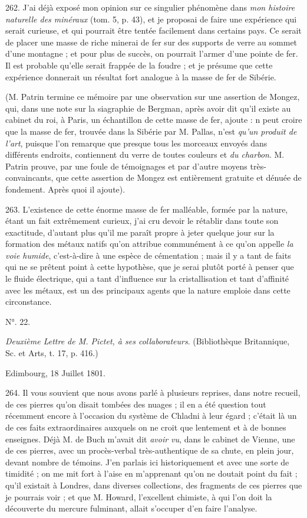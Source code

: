 \documentclass[a4paper, 11pt, oneside, polutonikogreek, french]{article}
\begin{document}
262. J'ai déjà exposé mon opinion sur ce singulier phénomène dans \emph{mon histoire naturelle des minéraux} (tom. 5, p. 43), et je proposai de faire une expérience qui serait curieuse, et qui pourrait être tentée facilement dans certains pays. Ce serait de placer une masse de riche minerai de fer sur des supports de verre au sommet d'une montagne ; et pour plus de succès, on pourrait l'armer d'une pointe de fer. Il est probable qu'elle serait frappée de la foudre ; et je présume que cette expérience donnerait un résultat fort analogue à la masse de fer de Sibérie.

(M. Patrin termine ce mémoire par une observation sur une assertion de Mongez, qui, dans une note sur la siagraphie de Bergman, après avoir dit qu'il existe au cabinet du roi, à Paris, un échantillon de cette masse de fer, ajoute : \og n peut croire que la masse de fer, trouvée dans la Sibérie par M. Pallas, n'est \emph{qu'un produit de l'art}, puisque l'on remarque que presque tous les morceaux envoyés dans différents endroits, contiennent du verre de toutes couleurs et \emph{du charbon}. \fg M. Patrin prouve, par une foule de témoignages et par d'autre moyens très-convaincants, que cette assertion de Mongez est entièrement gratuite et dénuée de fondement. Après quoi il ajoute).

263. \og L'existence de cette énorme masse de fer malléable, formée par la nature, étant un fait extrêmement curieux, j'ai cru devoir le rétablir dans toute son exactitude, d'autant plus qu'il me paraît propre à jeter quelque jour sur la formation des métaux natifs qu'on attribue communément à ce qu'on appelle \emph{la voie humide}, c'est-à-dire à une espèce de cémentation ; mais il y a tant de faits qui ne se prêtent point à cette hypothèse, que je serai plutôt porté à penser que le fluide électrique, qui a tant d'influence sur la cristallisation et tant d'affinité avec les métaux, est un des principaux agents que la nature emploie dans cette circonstance. \fg

\begin{center}
N°. 22.
\end{center}

\emph{Deuxième Lettre de M. Pictet, à ses collaborateurs}. (Bibliothèque Britannique, Sc. et Arts, t. 17, p. 416.)

Edimbourg, 18 Juillet 1801.

264. Il vous souvient que nous avons parlé à plusieurs reprises, dans notre recueil, de ces pierres qu'on disait tombées des nuages ; il en a été question tout récemment encore à l'occasion du système de Chladni à leur égard ; c'était là un de ces faits extraordinaires auxquels on ne croit que lentement et à de bonnes enseignes. Déjà M. de Buch m'avait dit \emph{avoir vu}, dans le cabinet de Vienne, une de ces pierres, avec un procès-verbal très-authentique de sa chute, en plein jour, devant nombre de témoins. J'en parlais ici historiquement et avec une sorte de timidité ; on me mit fort à l'aise en m'apprenant qu'on ne doutait point du fait ; qu'il existait à Londres, dans diverses collections, des fragments de ces pierres que je pourrais voir ; et que M. Howard, l'excellent chimiste, à qui l'on doit la découverte du mercure fulminant, allait s'occuper d'en faire l'analyse.
\end{document}
